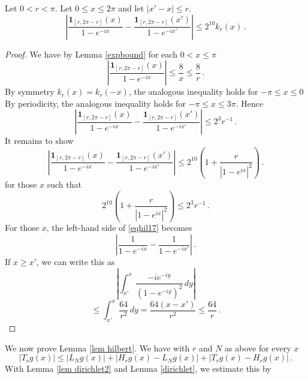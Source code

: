 {\begin{lemma}\label{lem dirichlet3}
Let $0<r<\pi$.  Let $0\le x\le 2\pi$ and let $|x'-x|\le r$.
\begin{equation}\label{eqdifftrans}
    |\frac{\mathbf{1}_{[r, 2\pi -r]}(x)}{1-e^{-ix}}-\frac{\mathbf{1}_{[r, 2\pi -r]}(x')}{1-e^{-ix'}}|\le 2^{10}k_r(x)\, .
\end{equation}
\end{lemma}

\begin{proof}
We have by Lemma \ref{expbound} for each $0<x\le \pi$
\begin{equation}
    |\frac{\mathbf{1}_{[r, 2\pi -r]}(x)}{1-e^{-ix}}|\le \frac 8x\le \frac 8r\, .
\end{equation}
By symmetry $k_r(x)=k_r(-x)$, the analogous inequality holds for $-\pi \le x\le 0$
By periodicity, the analogous inequality holds for $-\pi\le x\le 3\pi$.
Hence
\begin{equation}\label{eqhil16}
    |\frac{\mathbf{1}_{[r, 2\pi -r]}(x)}{1-e^{-ix}}-\frac{\mathbf{1}_{[r, 2\pi -r]}(x')}{1-e^{-ix'}}|\le 2^{3}r^{-1}\, .
\end{equation}
It remains to show
\begin{equation}\label{eqhil17}
    |\frac{\mathbf{1}_{[r, 2\pi -r]}(x)}{1-e^{-ix}}-\frac{\mathbf{1}_{[r, 2\pi -r]}(x')}{1-e^{-ix'}}|\le 2^{10}\left(1+\frac{r}{|1-e^{ix}|^2}\right)\, .
\end{equation}
for those $x$ such that
\begin{equation}\label{eqhil15}
 2^{10}\left(1+\frac{r}{|1-e^{ix}|^2}\right)\le 2^{3}r^{-1}\, .
\end{equation}
 For those $x$, the left-hand side  of \eqref{eqhil17} becomes
 \begin{equation}
    |\frac{1}{1-e^{-ix}}-\frac{1}{1-e^{-ix'}}|\, .
\end{equation}
If $x\ge x'$, we can write this as
\begin{equation*}
    |\int_{x'}^x \frac{-ie^{-iy}}{(1-e^{-iy})^2}\, dy|
\end{equation*}
\begin{equation}
    \le \int_{x'}^x \frac{64}{r^2}\, dy=\frac{64(x-x')}{r^2}\le \frac{64}r\, .
\end{equation}


\end{proof}

We now prove Lemma \ref{lem hilbert}.
We have with $r$ and $N$ as above for every $x$
\begin{equation}
|T_rg(x)|\le |L_Ng(x)|+ |H_rg(x)-L_Ng(x)|+ |T_rg(x)-H_rg(x)|\, .
\end{equation}
With Lemma \ref{lem dirichlet2} and Lemma \ref{dirichlet}, we estimate this by

}
